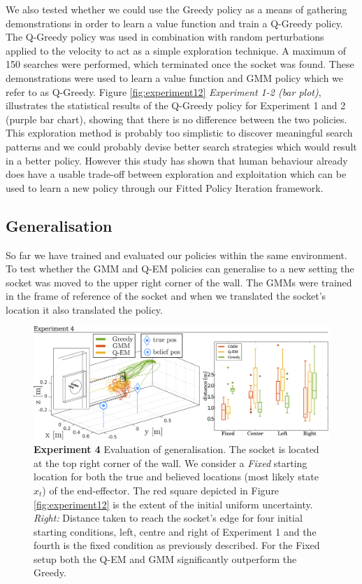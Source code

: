 \documentclass[final,5p,times,twocolumn]{elsarticle}
\begin{document}
We also tested whether we could use the Greedy policy as a means of gathering demonstrations in order to learn a value function and 
train a Q-Greedy policy. The Q-Greedy policy was used in combination with random perturbations applied to the velocity to act as 
a simple exploration technique. A maximum of 150 searches were performed, which terminated once the socket was found. 
These demonstrations were used to learn a value function and GMM policy which we refer to as Q-Greedy. 
Figure \ref{fig:experiment12} \textit{Experiment 1-2 (bar plot)}, illustrates the statistical results of the 
Q-Greedy policy for Experiment 1 and 2 (purple bar chart), showing that there is no difference between the two policies. 
This exploration method is probably too simplistic to discover meaningful search patterns and we could probably devise better 
search strategies which would result in a better policy. However this study has shown that human behaviour already does have a usable trade-off 
between exploration and exploitation which can be used to learn a new policy through our Fitted Policy Iteration framework.

\subsection{Generalisation}

So far we have trained and evaluated our policies within the same environment.
To test whether the GMM and Q-EM policies can generalise to a new setting the socket
was moved to the upper right corner of the wall. The GMMs were trained in the frame of reference of the socket and
when we translated the socket's location it also translated the policy. 

\begin{figure}
 \centering
    \includegraphics[width=\linewidth]{./Figure/experiment4.pdf}
    \caption{\textbf{Experiment 4} Evaluation of generalisation. The socket is located at the top right corner of the wall. We consider a 
    \textit{Fixed} starting location for both the true and believed locations (most likely state $\hat{x}_t$) of the end-effector. The red square depicted 
    in Figure \ref{fig:experiment12} is the extent of the initial uniform uncertainty. \textit{Right:} Distance taken to reach the socket's edge for 
    four initial starting conditions, left, centre and right of Experiment 1 and the fourth is the fixed condition as previously described. 
    For the Fixed setup both the Q-EM and GMM significantly outperform the Greedy.}
    \label{fig:experiment4}
\end{figure}
\end{document}

